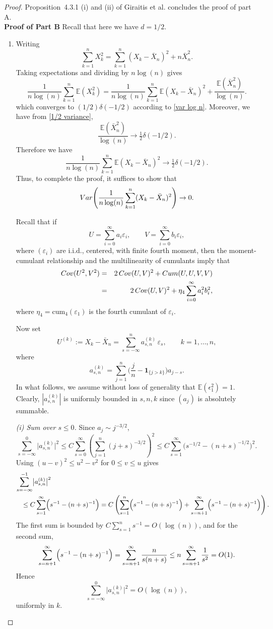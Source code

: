 \documentclass[10pt,a4paper]{amsart}
\numberwithin{equation}{section}
\newcommand{\Cov}{{\rm Cov}}
\newcommand{\Var}{{\rm Var}}
\begin{document}
\begin{proof}
  Proposition~4.3.1 (i) and (ii) of Giraitis et al. concludes the proof of part A.\\
  {\bf Proof of Part B} Recall that here we have $d=1/2.$
\begin{enumerate}
    \item
Writing
\[
\sum_{k=1}^n X_k^2
=\sum_{k=1}^n (X_k-\bar X_n)^2+n\bar X_n^2.
\] Taking expectations and dividing by $n\log(n)$ gives
\[
\frac{1}{n\log(n)}\sum_{k=1}^n \mathbb E(X_k^2)
=
\frac{1}{n\log(n)}\sum_{k=1}^n \mathbb E(X_k-\bar X_n)^2
+\frac{\mathbb E(\bar X_n^2)}{\log(n)}.
\]
which converges to $(1/2)\delta(-1/2)$ according to \eqref{var log n}.
Moreover, we have from \eqref{1/2 variance},
\[
\frac{\mathbb E(\bar X_n^2)}{\log(n)}\to \tfrac12\delta(-1/2).
\]
Therefore we have
\[
\frac{1}{n\log(n)}\sum_{k=1}^n \mathbb E(X_k-\bar X_n)^2\to \tfrac12\delta(-1/2).
\]
Thus, to complete the proof, it suffices to show that
\begin{equation}\label{lim var}
\Var\!\left(
\frac{1}{n\log(n)}\sum_{k=1}^n (X_k-\bar X_n)^2
\right)\to0.
\end{equation}

Recall that if
\[
U=\sum_{i=0}^\infty a_i\varepsilon_i,
\qquad
V=\sum_{i=0}^\infty b_i\varepsilon_i,
\]
where $(\varepsilon_i)$ are i.i.d., centered, with finite fourth moment, then  the moment-cumulant relationship and the multilinearity of cumulants imply that
\begin{eqnarray*}
\Cov(U^2,V^2)&=&2\,\Cov(U,V)^2+\textrm{Cum}(U,U,V,V)\\
&=&2\,\Cov(U,V)^2+\eta_4\sum_{i=0}^\infty a_i^2 b_i^2,
\end{eqnarray*}
where $\eta_4=\textrm{cum}_4(\varepsilon_1)$ is the fourth cumulant of $\varepsilon_i$.

Now set
\[
U^{(k)}:=X_k-\bar X_n
=\sum_{s=-\infty}^n a_{s,n}^{(k)}\,\varepsilon_s,
\qquad k=1,\dots,n,
\]
where
\[
a_{s,n}^{(k)}
=\sum_{j=1}^n\Big(\frac{j}{n}-\mathbf 1_{\{j>k\}}\Big)a_{j-s}.
\]
In what follows, we assume without loss of generality that $\mathbb{E}(\epsilon_1^2)=1.$
Clearly, $|a_{s,n}^{(k)}|$ is uniformly bounded in $s,n,k$ since $(a_j)$ is absolutely summable.

\medskip
\noindent\emph{(i) Sum over $s\le0$.}
Since $a_j\sim j^{-3/2}$,
\[
\sum_{s=-\infty}^{0}\bigl|a_{s,n}^{(k)}\bigr|^2
\le
C\sum_{s=0}^{\infty}\left(\sum_{j=1}^{n}(j+s)^{-3/2}\right)^2
\le
C\sum_{s=1}^{\infty}\bigl(s^{-1/2}-(n+s)^{-1/2}\bigr)^2.
\]
Using $(u-v)^2\le u^2-v^2$ for $0\le v\le u$ gives
\begin{eqnarray*}\lefteqn{
\sum_{s=-\infty}^{-1}\bigl|a_{s,n}^{(k)}\bigr|^2}\\
&&\le
C\sum_{s=1}^{\infty}\Bigl(s^{-1}-(n+s)^{-1}\Bigr)
=
C\left(\sum_{s=1}^{n}\Bigl(s^{-1}-(n+s)^{-1}\Bigr)+\sum_{s=n+1}^{\infty}\Bigl(s^{-1}-(n+s)^{-1}\Bigr)\right).
\end{eqnarray*}
The first sum is bounded by $C\sum_{s=1}^{n}s^{-1}=O(\log(n))$, and for the second sum,
\[
\sum_{s=n+1}^{\infty}\Bigl(s^{-1}-(n+s)^{-1}\Bigr)
=\sum_{s=n+1}^\infty \frac{n}{s(n+s)}
\le n\sum_{s=n+1}^\infty \frac{1}{s^2}=O(1).
     \]
Hence
\[
\sum_{s=-\infty}^{0}\bigl|a_{s,n}^{(k)}\bigr|^2=O(\log(n)),
\]
uniformly in $k$.


\end{enumerate}
\end{proof}
\end{document}
